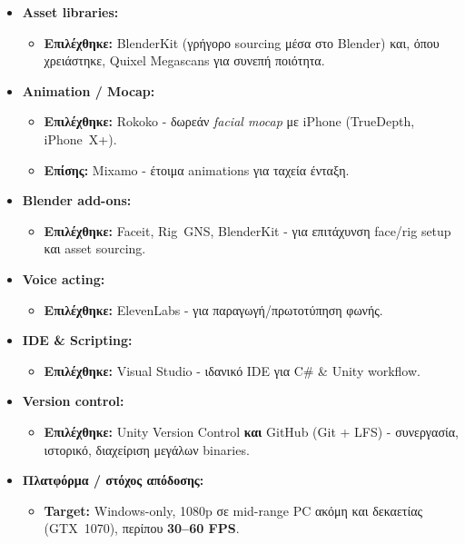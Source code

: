 \begin{itemize}
  \item \textbf{Asset libraries:}
  \begin{itemize}
    \item \textbf{Επιλέχθηκε:} BlenderKit (γρήγορο sourcing μέσα στο Blender) και, όπου χρειάστηκε, Quixel Megascans για συνεπή ποιότητα.
  \end{itemize}

  \item \textbf{Animation / Mocap:}
  \begin{itemize}
    \item \textbf{Επιλέχθηκε:} Rokoko - δωρεάν \textit{facial mocap} με iPhone (TrueDepth, iPhone~X+).
    \item \textbf{Επίσης:} Mixamo - έτοιμα animations για ταχεία ένταξη.
  \end{itemize}

  \item \textbf{Blender add-ons:}
  \begin{itemize}
    \item \textbf{Επιλέχθηκε:} Faceit, Rig~GNS, BlenderKit - για επιτάχυνση face/rig setup και asset sourcing.
  \end{itemize}

  \item \textbf{Voice acting:}
  \begin{itemize}
    \item \textbf{Επιλέχθηκε:} ElevenLabs - για παραγωγή/πρωτοτύπηση φωνής.
  \end{itemize}

  \item \textbf{IDE \& Scripting:}
  \begin{itemize}
    \item \textbf{Επιλέχθηκε:} Visual Studio - ιδανικό IDE για C\# \& Unity workflow.
  \end{itemize}

  \item \textbf{Version control:}
  \begin{itemize}
    \item \textbf{Επιλέχθηκε:} Unity Version Control \textbf{και} GitHub (Git + LFS) - συνεργασία, ιστορικό, διαχείριση μεγάλων binaries.
  \end{itemize}

  \item \textbf{Πλατφόρμα / στόχος απόδοσης:}
  \begin{itemize}
    \item \textbf{Target:} Windows-only, 1080p σε mid-range PC ακόμη και δεκαετίας (GTX~1070), περίπου \textbf{30–60 FPS}.
  \end{itemize}
\end{itemize}


